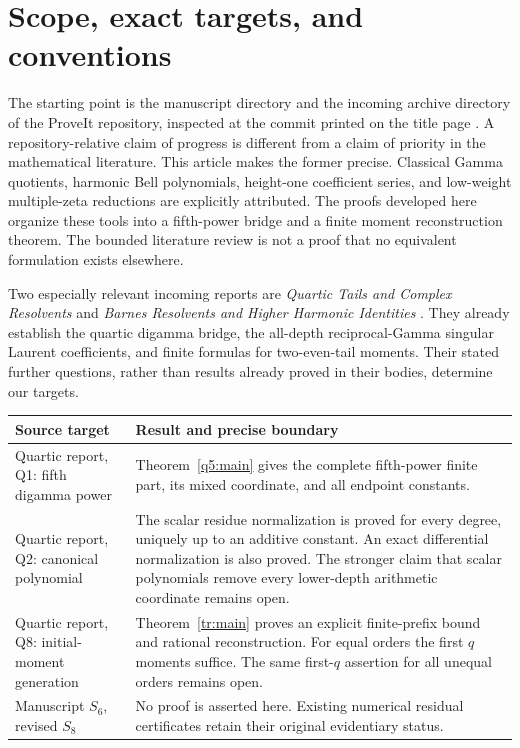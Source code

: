 \section{Scope, exact targets, and conventions}
\label{sec:scope}

The starting point is the manuscript directory and the incoming archive
directory of the ProveIt repository, inspected at the commit printed on
the title page \cite{Repo}. A repository-relative claim of progress is
different from a claim of priority in the mathematical literature.
This article makes the former precise. Classical Gamma quotients,
harmonic Bell polynomials, height-one coefficient series, and
low-weight multiple-zeta reductions are explicitly attributed. The
proofs developed here organize these tools into a fifth-power bridge
and a finite moment reconstruction theorem. The bounded literature
review is not a proof that no equivalent formulation exists elsewhere.

Two especially relevant incoming reports are \emph{Quartic Tails and
Complex Resolvents} and \emph{Barnes Resolvents and Higher Harmonic Identities}
\cite{Quartic,Barnes}. They already establish the quartic digamma bridge,
the all-depth reciprocal-Gamma singular Laurent coefficients, and finite
formulas for two-even-tail moments. Their stated further questions,
rather than results already proved in their bodies, determine our targets.

\begin{center}
\small
\begin{tabular}{@{}>{\raggedright\arraybackslash}p{}>{\raggedright\arraybackslash}p{}@{}}
\toprule
Source target & Result and precise boundary \\
\midrule
Quartic report, Q1: fifth digamma power &
Theorem~\ref{q5:main} gives the complete fifth-power finite part, its
mixed coordinate, and all endpoint constants. \\[5pt]
Quartic report, Q2: canonical polynomial &
The scalar residue normalization is proved for every degree, uniquely
up to an additive constant. An exact differential normalization is also
proved. The stronger claim that scalar polynomials remove every
lower-depth arithmetic coordinate remains open. \\[5pt]
Quartic report, Q8: initial-moment generation &
Theorem~\ref{tr:main} proves an explicit finite-prefix bound and rational
reconstruction. For equal orders the first $q$ moments suffice. The
same first-$q$ assertion for all unequal orders remains open. \\[5pt]
Manuscript $S_6$, revised $S_8$ &
No proof is asserted here. Existing numerical residual certificates
retain their original evidentiary status. \\
\bottomrule
\end{tabular}
\end{center}

